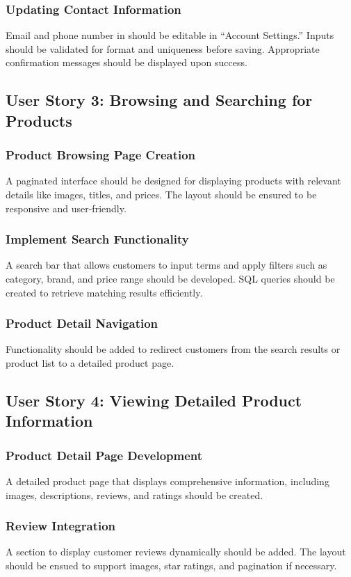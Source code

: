 \documentclass[twoside,a4paper,journal]{IEEEtran}
\begin{document}
\subsubsection{Updating Contact Information}
Email and phone number in should be editable in ``Account Settings.''
Inputs should be validated for format and uniqueness before saving.
Appropriate confirmation messages should be displayed upon success.

\subsection{User Story 3: Browsing and Searching for Products}
\subsubsection{Product Browsing Page Creation}
A paginated interface should be designed for displaying products with relevant
details like images, titles, and prices.
The layout should be ensured to be responsive and user-friendly.
\subsubsection{Implement Search Functionality}
A search bar that allows customers to input terms and apply filters
such as category, brand, and price range should be developed.
SQL queries should be created to retrieve matching results efficiently.
\subsubsection{Product Detail Navigation}
Functionality should be added to redirect customers from the search results or
product list to a detailed product page.

\subsection{User Story 4: Viewing Detailed Product Information}
\subsubsection{Product Detail Page Development}
A detailed product page that displays comprehensive information,
including images, descriptions, reviews, and ratings should be created.
\subsubsection{Review Integration}
A section to display customer reviews dynamically should be added.
The layout should be ensued to support images, star ratings,
and pagination if necessary.
\end{document}
